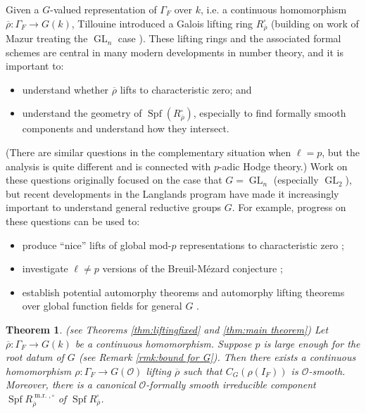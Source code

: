 \documentclass[11pt, letterpaper,english]{amsart}
\theoremstyle{plain}
\newtheorem{theorem}[lem]{Theorem}
\theoremstyle{definition}
\numberwithin{equation}{section}
\numberwithin{lem}{section}
\newcommand{\cO}{\mathcal{O}}
\newcommand{\rhobar}{{\overline{\rho}}}
\DeclareMathOperator{\Spf}{Spf}
\DeclareMathOperator{\GL}{GL}
\newcommand{\cent}[2]{C_{#1}(#2)}
\DeclareMathOperator{\mr}{m.r.}
\renewcommand{\mr}{\operatorname{m.r.}}
\begin{document}
Given a $G$-valued representation of $\Gamma_F$ over $k$, i.e. a continuous homomorphism $\rhobar: \Gamma_F \to G(k)$,
Tillouine\cite{tilouine96} introduced a Galois lifting ring $R_{\rhobar}^\square$ (building on work of Mazur treating the $\GL_n$ case \cite{mazur87,mazur95}).  These lifting rings and the associated formal schemes are central in many modern developments in number theory, and it is important to:
\begin{itemize}
    \item understand whether $\rhobar$ lifts to characteristic zero; and
    
    \item understand the geometry of $\Spf(R_{\rhobar}^{\square})$, especially to find formally smooth components and understand how they intersect.
\end{itemize}
(There are similar questions in the complementary situation when $\ell = p$, but the analysis is quite different and is connected with $p$-adic Hodge theory.)  Work on these questions originally focused on the case that $G = \GL_n$ (especially $\GL_2$), but recent developments in the Langlands program have made it increasingly important to understand general reductive groups $G$.  
%
For example, progress on these questions can be used to:
\begin{itemize}
    \item produce ``nice'' lifts of global mod-$p$ representations to characteristic zero \cite{ram02,hr08,patrikis16,booher19jnt,tang19,fkp21,fkp22};
    \item  investigate $\ell \neq p$ versions of the Breuil-M\'{e}zard conjecture \cite{shotton18,shotton20,shotton23};
    \item  establish potential automorphy theorems and automorphy lifting theorems over global function fields for general $G$ \cite{BHKT,boeckle-cyclic}. 
    \end{itemize}
    
%
%
%
%
%

%
%

%

\begin{theorem} \label{thm:intromain} (see Theorems \ref{thm:liftingfixed} and \ref{thm:main theorem})
Let $\rhobar : \Gamma_F \to G(k)$ be a continuous homomorphism.  
Suppose $p$ is large enough for the root datum of $G$ (see Remark \ref{rmk:bound for G}). 
Then there exists a continuous homomorphism $\rho: \Gamma_F \to G(\cO)$ lifting $\rhobar$ such that $\cent{G}{\rho(I_F)}$ is $\cO$-smooth. 
Moreover, there is a canonical $\cO$-formally smooth irreducible component $\Spf R_{\rhobar}^{\mr, \square}$ of $\Spf R_{\rhobar}^{\square}$. %
%
%
    
%
%
\end{theorem}
\end{document}
